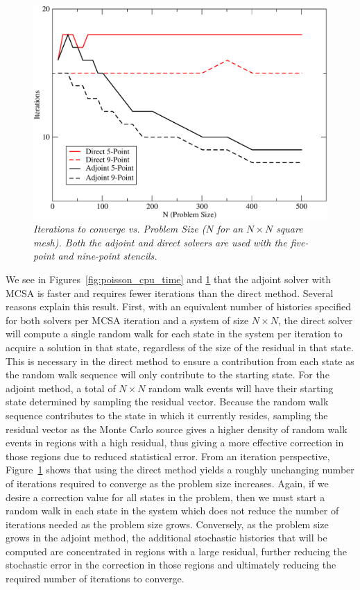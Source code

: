 \documentclass[preprint,12pt]{elsarticle}
\begin{document}
\begin{figure}[ht!]
  \centering
  \includegraphics[width=5in,clip]{dir_adj_iterations.pdf}
  \caption{\sl Iterations to converge vs. Problem Size ($N$ for an $N
    \times N$ square mesh). Both the adjoint and direct solvers are
    used with the five-point and nine-point stencils. }
  \label{fig:poisson_iterations}
\end{figure}

We see in Figures~\ref{fig:poisson_cpu_time} and \ref{fig:poisson_iterations}
that the adjoint solver with MCSA is faster and requires fewer iterations than
the direct method. Several reasons explain this result. First, with an
equivalent number of histories specified for both solvers per MCSA iteration
and a system of size $N \times N$, the direct solver will compute a single
random walk for each state in the system per iteration to acquire a solution
in that state, regardless of the size of the residual in that state. This is
necessary in the direct method to ensure a contribution from each state as the
random walk sequence will only contribute to the starting state. For the
adjoint method, a total of $N \times N$ random walk events will have their
starting state determined by sampling the residual vector. Because the random
walk sequence contributes to the state in which it currently resides, sampling
the residual vector as the Monte Carlo source gives a higher density of random
walk events in regions with a high residual, thus giving a more effective
correction in those regions due to reduced statistical error. From an
iteration perspective, Figure~\ref{fig:poisson_iterations} shows that using
the direct method yields a roughly unchanging number of iterations required to
converge as the problem size increases. Again, if we desire a correction value
for all states in the problem, then we must start a random walk in each state
in the system which does not reduce the number of iterations needed as the
problem size grows. Conversely, as the problem size grows in the adjoint
method, the additional stochastic histories that will be computed are
concentrated in regions with a large residual, further reducing the stochastic
error in the correction in those regions and ultimately reducing the required
number of iterations to converge.
\end{document}

